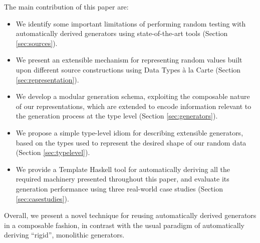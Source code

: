 %
%
The main contribution of this paper are:
%
%
\begin{itemize}
\item We identify some important limitations of performing random testing with
  automatically derived generators using state-of-the-art tools (Section
  \ref{sec:sources}).
\item We present an extensible mechanism for representing random values built
  upon different source constructions using Data Types \`a la Carte (Section
  \ref{sec:representation}).
\item We develop a modular generation schema, exploiting the composable nature
  of our representations, which are extended to encode information relevant to
  the generation process at the type level (Section \ref{sec:generators}).
\item We propose a simple type-level idiom for describing extensible generators,
  based on the types used to represent the desired shape of our random data
  (Section \ref{sec:typelevel}).
\item We provide a Template Haskell tool for automatically deriving all the
  required machinery presented throughout this paper, and evaluate its
  generation performance using three real-world case studies (Section
  \ref{sec:casestudies}).
\end{itemize}

Overall, we present a novel technique for reusing automatically derived
generators in a composable fashion, in contrast with the usual paradigm of
automatically deriving ``rigid'', monolithic generators.
